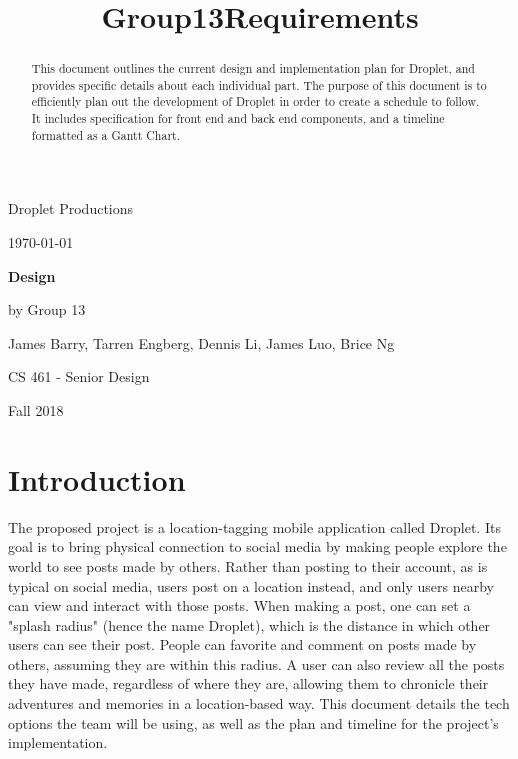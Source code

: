\documentclass[draftclsnofoot, onecolumn, letterpaper,10pt,compsoc]{IEEEtran}
\title{Group13Requirements}
\def \TitlePageHeader{Droplet Productions}
\def \TitlePageTitle{Design}
\def \GroupNumber{by Group 13}
\def \GroupMembers{James Barry, Tarren Engberg, Dennis Li, James Luo,  Brice Ng}
\def \CourseTitle{CS 461 - Senior Design}
\def \CourseTerm{Fall 2018}
\newcommand{\NameSigPair}[1]{\par
\makebox[2.75in][r]{#1} \hfil 	\makebox[3.25in]{\makebox[2.25in]{\hrulefill} \hfill		\makebox[.75in]{\hrulefill}}
\par\vspace{-12pt} \textit{\tiny\noindent
\makebox[2.75in]{} \hfil		\makebox[3.25in]{\makebox[2.25in][r]{Signature} \hfill	\makebox[.75in][r]{Date}}}}
\renewcommand{\NameSigPair}[1]{#1}
\begin{document}
\begin{titlepage}
    \begin{singlespace}
        \hfill    
        \par\vspace{.2in}
        \centering
        \scshape{
            \huge \TitlePageHeader \par
            {\large\today}\par
            \vspace{.5in}
            \textbf{\Huge \TitlePageTitle }\par
            \vfill
            \vspace{5pt}

            \vspace{5pt}
            {\Large
                \NameSigPair{\GroupNumber}\par
            	\NameSigPair{\GroupMembers}\par
                \NameSigPair{\CourseTitle}\par
                \NameSigPair{\CourseTerm}\par
            }
            \vspace{20pt}
        }
    \end{singlespace}
    \begin{abstract}
    This document outlines the current design and implementation plan for Droplet, and provides specific details about each individual part. The purpose of this document is to efficiently plan out the development of Droplet in order to create a schedule to follow. It includes specification for front end and back end components, and a timeline formatted as a Gantt Chart.
    \end{abstract}
\end{titlepage}

\newpage
{}
\clearpage

\pagebreak

\tableofcontents

\pagebreak

\section{Introduction}
The proposed project is a location-tagging mobile application called Droplet. Its goal is to bring physical connection to social media by making people explore the world to see posts made by others. Rather than posting to their account, as is typical on social media, users post on a location instead, and only users nearby can view and interact with those posts. When making a post, one can set a "splash radius" (hence the name Droplet), which is the distance in which other users can see their post. People can favorite and comment on posts made by others, assuming they are within this radius. A user can also review all the posts they have made, regardless of where they are, allowing them to chronicle their adventures and memories in a location-based way. This document details the tech options the team will be using, as well as the plan and timeline for the project's implementation.
\end{document}
